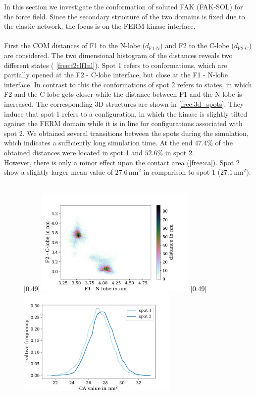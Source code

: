 \label{sec:fak_sol}
In this section we investigate the conformation of soluted FAK (FAK-SOL) for the \martini{} force field. Since the secondary structure of the two domains is fixed due to the elastic network, the focus is on the FERM kinase interface.\\
\\
First the COM distances of F1 to the N-lobe ($d_\text{F1-N}$) and F2 to the C-lobe ($d_\text{F2-C}$) are considered. The two dimensional histogram of the distances reveals two different states ( \autoref{free:f2clf1nl}). Spot 1 refers to conformations, which are partially opened at the F2 - C-lobe interface, but close at the F1 - N-lobe interface. In contrast to this the conformations of spot 2 refers to states, in which F2 and the C-lobe gets closer while the distance between F1 and the N-lobe is increased. The corresponding 3D structures are shown in \autoref{free:3d_spots}. They induce that spot 1 refers to a configuration, in which the kinase is slightly tilted against the FERM domain while it is in line for configurations associated with spot 2. We obtained several transitions between the spots during the simulation, which indicates a sufficiently long simulation time. At the end $47.4\%$ of the obtained distances were located in spot 1 and $52.6\%$ in spot 2.\\
However, there is only a minor effect upon the contact area (\autoref{free:ca}).  Spot 2 show a slightly larger mean value of $27.6\,\si{\nano\metre}^2$ in comparison to spot 1 ($27.1\,\si{\nano\metre}^2$).\\
\\
%
%
%
\begin{figure}
	\subcaptionbox{\label{free:f2clf1nl}}[0.49\textwidth]{
		\includegraphics[height=5.2cm]{figures/results/free_f1f2}
	}\hfill%
	\subcaptionbox{\label{free:ca}}[0.49\textwidth]{
		\includegraphics[height=5.2cm]{figures/results/free_ca}
	}%
\end{figure}
